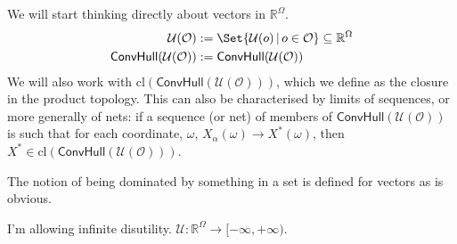 \documentclass[a4paper]{article}
\newtheorem{definition}{Definition}
\newcommand\cl{\mathrm{cl}}
\renewcommand\O{\mathcal{O}}
\newcommand\Uwald{\mathcal{U}} %
\renewcommand{\Re}{\mathbb{R}}
\newcommand{\Conv}{\mathsf{ConvHull}}
\newcommand\SetDelimiter[1][]{
	\nonscript\,#1\vert \allowbreak \nonscript\,\mathopen{}}
\providecommand\given{\SetDelimiter}
\renewcommand{\geq}{\geqslant}
\newenvironment{CCM rewritten}
{\begingroup\color{blue}} %
{\endgroup}              %
\begin{document}
	
	We will start thinking directly about vectors in $\Re^\Omega$. 
	\begin{align} 
		\Uwald(\O) &:= \Set{\Uwald(o)\given o\in \O}\subseteq\Re^\Omega\\
		\Conv(\Uwald(\O))&:=\mathsf{ConvHull}(\Uwald(\O))
	\end{align}
	We will also work with $\cl(\Conv(\Uwald(\O)))$, which we define as the closure in the product topology. This can also be characterised by limits of sequences, or more generally of nets: if a sequence (or net) of members of $\Conv(\Uwald(\O))$ is such that for each coordinate, $\omega$, $X_\alpha(\omega)\longrightarrow X^*(\omega)$, then $X^*\in\cl(\Conv(\Uwald(\O)))$. 
	
	
	The notion of being dominated by something in a set is defined for vectors as is obvious. 
	
	\begin{infversion}
		I'm allowing infinite disutility. $\Uwald:\Re^\Omega\to[-\infty,+\infty)$. 
	\end{infversion}
	
\end{document}
